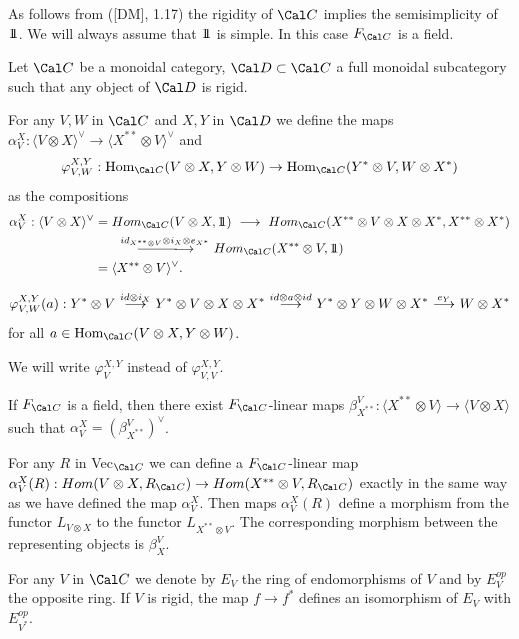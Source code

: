   As follows from ([DM], 1.17) the rigidity of ${\Cal C}$
implies the semisimplicity of $1\!\!1$.  We will always assume that $1\!\!1$
is simple.  In this case  $F_{\Cal C}$  is a field.
\enddemo

 Let  ${\Cal C}$  be a monoidal category,
${\Cal D} \subset {\Cal C}$  a full monoidal subcategory such that any
object of ${\Cal D}$  is rigid.


For any  $V,W$  in ${\Cal C}$  and $X,Y$  in ${\Cal D}$
we define the maps  $\alpha_V^{X}:  \langle V \otimes X\rangle^\vee \to
\langle X^{**} \otimes V\rangle^\vee$  and
$$
\varphi^{X,Y}_{V,W}: \text{Hom}_{{\Cal C}}(V \otimes X, Y \otimes W)
\to \text{Hom}_{{\Cal C}}(Y^* \otimes V, W \otimes X^*)
$$
as the compositions
$$
\aligned
\alpha^X_V: \langle V\otimes X\rangle^\vee &= Hom_{{\Cal C}}(V \otimes
X,\ident)\
\longrightarrow\ Hom_{{\Cal C}}(X^{**} \otimes V \otimes X \otimes
X^*, X^{**} \otimes X^*)\\
&\qquad {\buildrel{id_{X^{**}\otimes V}\otimes i_X \otimes
e_{X^*}}\over\llongrightarrow}\ Hom_{{\Cal C}}(X^{**} \otimes V,\ident) \\
&= \langle X^{**} \otimes V\rangle^\vee.
\endaligned
$$

$$
\varphi^{X,Y}_{V,W}(a):  Y^* \otimes V\
{\buildrel {id \otimes i_X}\over\longrightarrow}\ Y^* \otimes V \otimes X
\otimes X^*\ {\buildrel {id \otimes a \otimes id}\over\longrightarrow}\
Y^* \otimes Y \otimes W \otimes X^*\ {\buildrel {e_Y}\over\longrightarrow}\
W \otimes X^*
$$
for all $a \in \text{Hom}_{{\Cal C}}(V \otimes X, Y \otimes W)$.
\endproclaim

  We will write  $\varphi_V^{X,Y}$  instead of
$\varphi^{X,Y}_{V,V}$.
\enddemo

\proclaim{Lemma}  If  $F_{\Cal C}$  is a field, then there exist
$F_{\Cal C}$-linear maps $\beta^V_{X^{**}}: \langle X^{**} \otimes V\rangle
\to \langle V \otimes X\rangle$  such that $\alpha^X_V =
(\beta^V_{X^{**}})^\vee$.
\endproclaim

\demo{Proof}  For any $R$ in Vec$_{\Cal C}$  we can define a $F_{\Cal
C}$-linear
map  $\alpha^X_V(R):  Hom(V \otimes X, R_{\Cal C}) \to Hom(X^{**} \otimes V,
R_{\Cal C})$  exactly in the same way as we have defined the map
$\alpha^X_V$.   Then maps $\alpha^X_V(R)$  define a morphism from the functor
$L_{V \otimes X}$  to the functor  $L_{X^{**} \otimes V}$.  The corresponding
morphism
between the representing objects is  $\beta^V_X$.
\enddemo

 For any $V$ in ${\Cal C}$  we denote by $E_V$  the ring of
endomorphisms of $V$ and by  $E_V^{op}$  the opposite ring.  If
$V$ is rigid, the map $f \to f^*$  defines an isomorphism of $E_V$
with  $E^{op}_{V^*}$.


